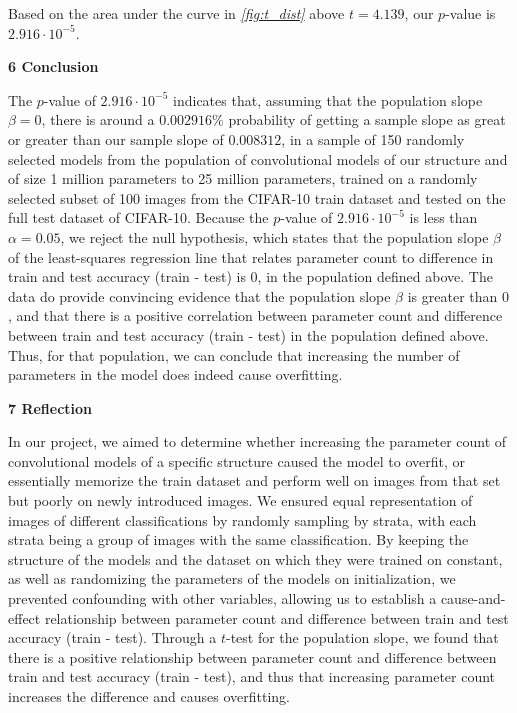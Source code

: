 \documentclass[12pt]{article}
\begin{document}
    \noindent Based on the area under the curve in \textit{\autoref{fig:t_dist}} above $t=4.139$, our $p$-value is $2.916\cdot10^{-5}$.

    \noindent\textbf{6 Conclusion}

    The $p$-value of $2.916\cdot10^{-5}$ indicates that, assuming that the population slope $\beta=0$, there is around a
    $0.002916\%$ probability of getting a sample slope as great or greater than our sample slope of $0.008312$, in a sample of
    150 randomly selected models from the population of convolutional models of our structure and of size 1 million parameters to 25 million parameters, trained
    on a randomly selected subset of 100 images from the CIFAR-10 train dataset and tested on the full test dataset of CIFAR-10.
    Because the $p$-value of $2.916\cdot10^{-5}$ is less than $\alpha=0.05$, we reject the null hypothesis, which states that the population slope $\beta$
    of the least-squares regression line that relates parameter count to difference in train and test accuracy (train - test) is $0$,
    in the population defined above.
    The data do provide convincing evidence that the population slope $\beta$ is greater than $0$, and that there is a positive correlation between
    parameter count and difference between train and test accuracy (train - test) in the population defined above. Thus, for that population, we can conclude that
    increasing the number of parameters in the model does indeed cause overfitting.


    \noindent\textbf{7 Reflection}

    In our project, we aimed to determine whether increasing the parameter count of convolutional models of a specific structure caused the model to overfit,
    or essentially memorize the train dataset and perform well on images from that set but poorly on newly introduced images. We ensured equal representation
    of images of different classifications by randomly sampling by strata, with each strata being a group of images with the same classification.
    By keeping the structure of the models and the dataset on which they were trained on constant, as well as randomizing the parameters of the models
    on initialization, we prevented confounding with other variables, allowing us to establish a cause-and-effect relationship between parameter count
    and difference between train and test accuracy (train - test). Through a $t$-test for the population slope, we found that there is a positive relationship
    between parameter count and difference between train and test accuracy (train - test), and thus that increasing parameter count increases the difference and causes overfitting.
\end{document}
